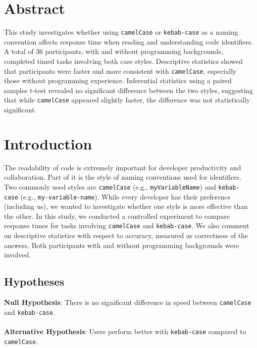 \documentclass[unicode,11pt,a4paper,oneside,numbers=endperiod,openany]{scrartcl}
\begin{document}
\setassignment
{}

\newline


\section{Abstract}
This study investigates whether using \texttt{camelCase} or \texttt{kebab-case} as a naming convention affects response time when reading and understanding code identifiers. A total of 36 participants, with and without programming backgrounds, completed timed tasks involving both case styles. Descriptive statistics showed that participants were faster and more consistent with \texttt{camelCase}, especially those without programming experience. Inferential statistics using a paired samples t-test revealed no significant difference between the two styles, suggesting that while \texttt{camelCase} appeared slightly faster, the difference was not statistically significant.

\section{Introduction}
The readability of code is extremely important for developer productivity and collaboration. Part of it is the style of naming conventions used for identifiers. Two commonly used styles are \texttt{camelCase} (e.g., \texttt{myVariableName}) and \texttt{kebab-case} (e.g., \texttt{my-variable-name}). While every developer has their preference (including us), we wanted to investigate whether one style is more effective than the other.
In this study, we conducted a controlled experiment to compare response times for tasks involving \texttt{camelCase} and \texttt{kebab-case}. We also comment on descriptive statistics with respect to accuracy, measured as correctness of the answers. Both participants with and without programming backgrounds were involved.


\subsection{Hypotheses}
\textbf{Null Hypothesis}: There is no significant difference in speed between \texttt{camelCase} and \texttt{kebab-case}. \\
\hfill \\
\textbf{Alternative Hypothesis}: Users perform better with \texttt{kebab-case} compared to \texttt{camelCase}.
\end{document}
